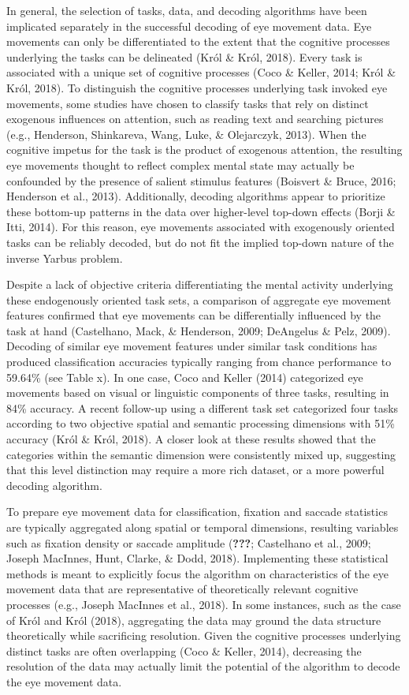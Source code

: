 \documentclass[
  english,
  man]{apa6}
\begin{document}
In general, the selection of tasks, data, and decoding algorithms have been implicated separately in the successful decoding of eye movement data. Eye movements can only be differentiated to the extent that the cognitive processes underlying the tasks can be delineated (Król \& Król, 2018). Every task is associated with a unique set of cognitive processes (Coco \& Keller, 2014; Król \& Król, 2018). To distinguish the cognitive processes underlying task invoked eye movements, some studies have chosen to classify tasks that rely on distinct exogenous influences on attention, such as reading text and searching pictures (e.g., Henderson, Shinkareva, Wang, Luke, \& Olejarczyk, 2013). When the cognitive impetus for the task is the product of exogenous attention, the resulting eye movements thought to reflect complex mental state may actually be confounded by the presence of salient stimulus features (Boisvert \& Bruce, 2016; Henderson et al., 2013). Additionally, decoding algorithms appear to prioritize these bottom-up patterns in the data over higher-level top-down effects (Borji \& Itti, 2014). For this reason, eye movements associated with exogenously oriented tasks can be reliably decoded, but do not fit the implied top-down nature of the inverse Yarbus problem.

Despite a lack of objective criteria differentiating the mental activity underlying these endogenously oriented task sets, a comparison of aggregate eye movement features confirmed that eye movements can be differentially influenced by the task at hand (Castelhano, Mack, \& Henderson, 2009; DeAngelus \& Pelz, 2009). Decoding of similar eye movement features under similar task conditions has produced classification accuracies typically ranging from chance performance to 59.64\% (see Table x). In one case, Coco and Keller (2014) categorized eye movements based on visual or linguistic components of three tasks, resulting in 84\% accuracy. A recent follow-up using a different task set categorized four tasks according to two objective spatial and semantic processing dimensions with 51\% accuracy (Król \& Król, 2018). A closer look at these results showed that the categories within the semantic dimension were consistently mixed up, suggesting that this level distinction may require a more rich dataset, or a more powerful decoding algorithm.

To prepare eye movement data for classification, fixation and saccade statistics are typically aggregated along spatial or temporal dimensions, resulting variables such as fixation density or saccade amplitude ({\textbf{???}}; Castelhano et al., 2009; Joseph MacInnes, Hunt, Clarke, \& Dodd, 2018). Implementing these statistical methods is meant to explicitly focus the algorithm on characteristics of the eye movement data that are representative of theoretically relevant cognitive processes (e.g., Joseph MacInnes et al., 2018). In some instances, such as the case of Król and Król (2018), aggregating the data may ground the data structure theoretically while sacrificing resolution. Given the cognitive processes underlying distinct tasks are often overlapping (Coco \& Keller, 2014), decreasing the resolution of the data may actually limit the potential of the algorithm to decode the eye movement data.
\end{document}
